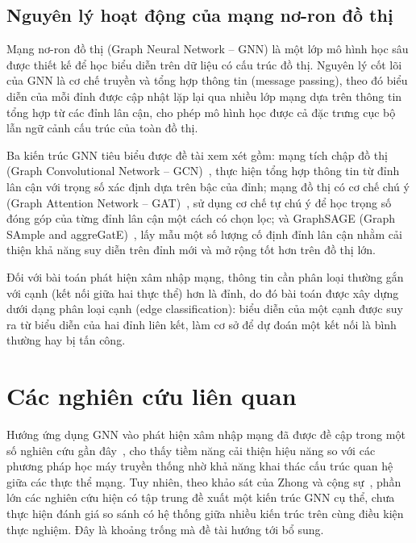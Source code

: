 \subsection{Nguyên lý hoạt động của mạng nơ-ron đồ thị}

Mạng nơ-ron đồ thị (Graph Neural Network -- GNN) là một lớp mô hình học sâu được thiết kế để học biểu diễn trên dữ liệu có cấu trúc đồ thị. Nguyên lý cốt lõi của GNN là cơ chế truyền và tổng hợp thông tin (message passing), theo đó biểu diễn của mỗi đỉnh được cập nhật lặp lại qua nhiều lớp mạng dựa trên thông tin tổng hợp từ các đỉnh lân cận, cho phép mô hình học được cả đặc trưng cục bộ lẫn ngữ cảnh cấu trúc của toàn đồ thị.

Ba kiến trúc GNN tiêu biểu được đề tài xem xét gồm: mạng tích chập đồ thị (Graph Convolutional Network -- GCN)~\cite{kipf2017gcn}, thực hiện tổng hợp thông tin từ đỉnh lân cận với trọng số xác định dựa trên bậc của đỉnh; mạng đồ thị có cơ chế chú ý (Graph Attention Network -- GAT)~\cite{velickovic2018gat}, sử dụng cơ chế tự chú ý để học trọng số đóng góp của từng đỉnh lân cận một cách có chọn lọc; và GraphSAGE (Graph SAmple and aggreGatE)~\cite{hamilton2017graphsage}, lấy mẫu một số lượng cố định đỉnh lân cận nhằm cải thiện khả năng suy diễn trên đỉnh mới và mở rộng tốt hơn trên đồ thị lớn.

Đối với bài toán phát hiện xâm nhập mạng, thông tin cần phân loại thường gắn với cạnh (kết nối giữa hai thực thể) hơn là đỉnh, do đó bài toán được xây dựng dưới dạng phân loại cạnh (edge classification): biểu diễn của một cạnh được suy ra từ biểu diễn của hai đỉnh liên kết, làm cơ sở để dự đoán một kết nối là bình thường hay bị tấn công.

\section{Các nghiên cứu liên quan}

Hướng ứng dụng GNN vào phát hiện xâm nhập mạng đã được đề cập trong một số nghiên cứu gần đây~\cite{bilot2023gnnids, caville2023anomale}, cho thấy tiềm năng cải thiện hiệu năng so với các phương pháp học máy truyền thống nhờ khả năng khai thác cấu trúc quan hệ giữa các thực thể mạng. Tuy nhiên, theo khảo sát của Zhong và cộng sự~\cite{zhong2024survey}, phần lớn các nghiên cứu hiện có tập trung đề xuất một kiến trúc GNN cụ thể, chưa thực hiện đánh giá so sánh có hệ thống giữa nhiều kiến trúc trên cùng điều kiện thực nghiệm. Đây là khoảng trống mà đề tài hướng tới bổ sung.